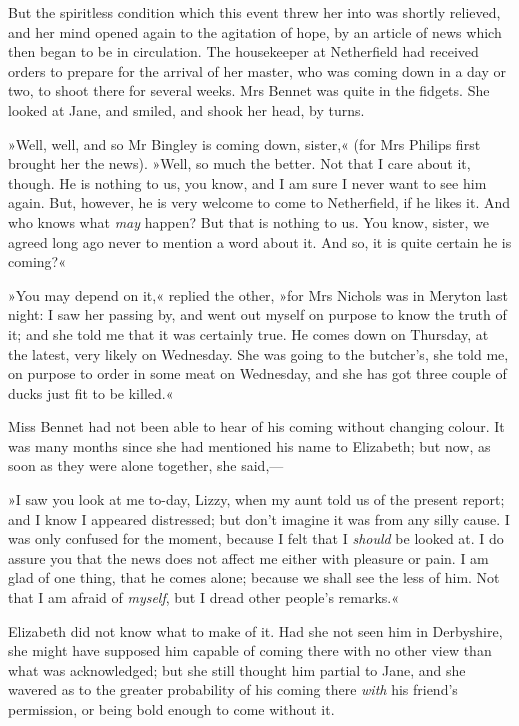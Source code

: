 But the spiritless condition which this event threw her into was shortly relieved, and her mind opened again to the agitation of hope, by an article of news which then began to be in circulation. The housekeeper at Netherfield had received orders to prepare for the arrival of her master, who was coming down in a day or two, to shoot there for several weeks. Mrs Bennet was quite in the fidgets. She looked at Jane, and smiled, and shook her head, by turns.

»Well, well, and so Mr Bingley is coming down, sister,« (for Mrs Philips first brought her the news). »Well, so much the better. Not that I care about it, though. He is nothing to us, you know, and I am sure I never want to see him again. But, however, he is very welcome to come to Netherfield, if he likes it. And who knows what \textit{may} happen? But that is nothing to us. You know, sister, we agreed long ago never to mention a word about it. And so, it is quite certain he is coming?«

»You may depend on it,« replied the other, »for Mrs Nichols was in Meryton last night: I saw her passing by, and went out myself on purpose to know the truth of it; and she told me that it was certainly true. He comes down on Thursday, at the latest, very likely on Wednesday. She was going to the butcher's, she told me, on purpose to order in some meat on Wednesday, and she has got three couple of ducks just fit to be killed.«

Miss Bennet had not been able to hear of his coming without changing colour. It was many months since she had mentioned his name to Elizabeth; but now, as soon as they were alone together, she said,—

»I saw you look at me to-day, Lizzy, when my aunt told us of the present report; and I know I appeared distressed; but don't imagine it was from any silly cause. I was only confused for the moment, because I felt that I \textit{should} be looked at. I do assure you that the news does not affect me either with pleasure or pain. I am glad of one thing, that he comes alone; because we shall see the less of him. Not that I am afraid of \textit{myself}, but I dread other people's remarks.«

Elizabeth did not know what to make of it. Had she not seen him in Derbyshire, she might have supposed him capable of coming there with no other view than what was acknowledged; but she still thought him partial to Jane, and she wavered as to the greater probability of his coming there \textit{with} his friend's permission, or being bold enough to come without it.

